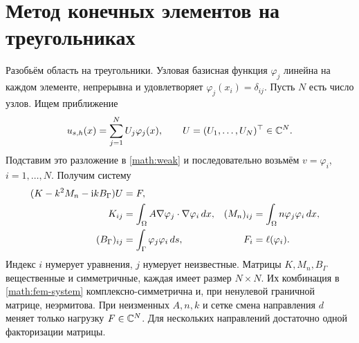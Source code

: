 \section{Метод конечных элементов на треугольниках}
Разобьём область на треугольники. Узловая базисная функция $\varphi_j$
линейна на каждом элементе, непрерывна и удовлетворяет
$\varphi_j(x_i)=\delta_{ij}$. Пусть $N$ есть число узлов. Ищем приближение
\begin{equation}
 u_{s,h}(x)=\sum_{j=1}^N U_j\varphi_j(x),\qquad
 U=(U_1,\ldots,U_N)^\top\in\mathbb{C}^N.\label{math:fem-expansion}
\end{equation}
Подставим это разложение в \eqref{math:weak} и последовательно возьмём
$v=\varphi_i$, $i=1,\ldots,N$. Получим систему
\begin{align}
 (K-k^2M_n-\mathrm{i} k B_\Gamma)U&=F,\label{math:fem-system}\\
 K_{ij}&=\int_\Omega A\nabla\varphi_j\cdot\nabla\varphi_i\,dx,
 & (M_n)_{ij}&=\int_\Omega n\varphi_j\varphi_i\,dx,\notag\\
 (B_\Gamma)_{ij}&=\int_\Gamma\varphi_j\varphi_i\,ds,
 & F_i&=\ell(\varphi_i).\notag
\end{align}
Индекс $i$ нумерует уравнения, $j$ нумерует неизвестные.
Матрицы $K,M_n,B_\Gamma$ вещественные и симметричные, каждая имеет
размер $N\times N$. Их комбинация в \eqref{math:fem-system}
комплексно-симметрична и, при ненулевой граничной матрице, неэрмитова.
При неизменных $A,n,k$ и сетке смена направления $d$ меняет только
нагрузку $F\in\mathbb{C}^N$. Для нескольких направлений достаточно одной
факторизации матрицы.

